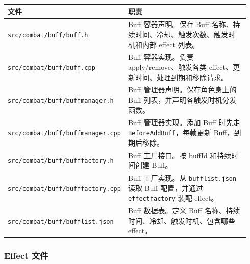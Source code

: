 \documentclass[UTF8,10pt]{ctexart}
\begin{document}
{\small
\begin{longtable}{p{0.34\linewidth}p{0.60\linewidth}}
\toprule
\textbf{文件} & \textbf{职责} \\
\midrule
\texttt{src/\allowbreak{}combat/\allowbreak{}buff/\allowbreak{}buff.\allowbreak{}h} & Buff 容器声明。保存 Buff 名称、持续时间、冷却、触发次数、触发时机和内部 effect 列表。 \\
\texttt{src/\allowbreak{}combat/\allowbreak{}buff/\allowbreak{}buff.\allowbreak{}cpp} & Buff 容器实现。负责 apply/remove、触发各类 effect、更新时间、处理到期和移除请求。 \\
\texttt{src/\allowbreak{}combat/\allowbreak{}buff/\allowbreak{}buffmanager.\allowbreak{}h} & Buff 管理器声明。保存角色身上的 Buff 列表，并声明各触发时机分发函数。 \\
\texttt{src/\allowbreak{}combat/\allowbreak{}buff/\allowbreak{}buffmanager.\allowbreak{}cpp} & Buff 管理器实现。添加 Buff 时先走 \texttt{BeforeAddBuff}，每帧更新 Buff，到期后移除。 \\
\texttt{src/\allowbreak{}combat/\allowbreak{}buff/\allowbreak{}bufffactory.\allowbreak{}h} & Buff 工厂接口。按 buffId 和持续时间创建 Buff。 \\
\texttt{src/\allowbreak{}combat/\allowbreak{}buff/\allowbreak{}bufffactory.\allowbreak{}cpp} & Buff 工厂实现。从 \texttt{bufflist.\allowbreak{}json} 读取 Buff 配置，并通过 \texttt{effectfactory} 装配 effect。 \\
\texttt{src/\allowbreak{}combat/\allowbreak{}buff/\allowbreak{}bufflist.\allowbreak{}json} & Buff 数据表。定义 Buff 名称、持续时间、冷却、触发时机、包含哪些 effect。 \\
\bottomrule
\end{longtable}
}

\subsubsection*{Effect 文件}
\end{document}
